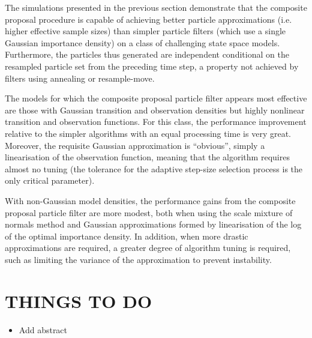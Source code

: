 \documentclass{article}
\begin{document}
The simulations presented in the previous section demonstrate that the composite proposal procedure is capable of achieving better particle approximations (i.e. higher effective sample sizes) than simpler particle filters (which use a single Gaussian importance density) on a class of challenging state space models. Furthermore, the particles thus generated are independent conditional on the resampled particle set from the preceding time step, a property not achieved by filters using annealing or resample-move.

The models for which the composite proposal particle filter appears most effective are those with Gaussian transition and observation densities but highly nonlinear transition and observation functions. For this class, the performance improvement relative to the simpler algorithms with an equal processing time is very great. Moreover, the requisite Gaussian approximation is ``obvious'', simply a linearisation of the observation function, meaning that the algorithm requires almost no tuning (the tolerance for the adaptive step-size selection process is the only critical parameter).

With non-Gaussian model densities, the performance gains from the composite proposal particle filter are more modest, both when using the scale mixture of normals method and Gaussian approximations formed by linearisation of the log of the optimal importance density. In addition, when more drastic approximations are required, a greater degree of algorithm tuning is required, such as limiting the variance of the approximation to prevent instability.



\section{THINGS TO DO}
\begin{itemize}
  \item Add abstract
\end{itemize}
\end{document}
